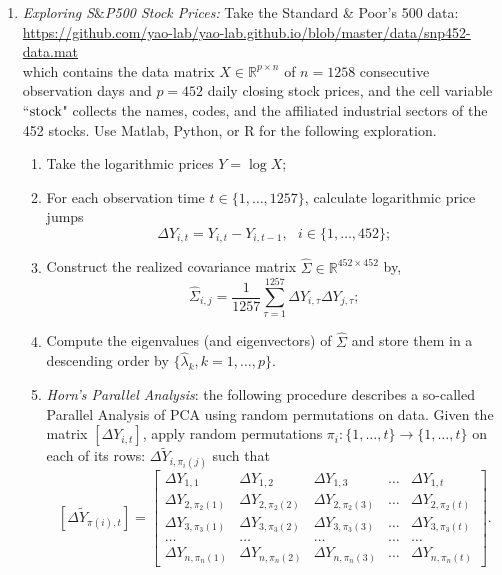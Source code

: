 \documentclass[11pt]{article}
\def\R{{\mathbb R}}
\begin{document}
\begin{enumerate}
\item {\em Exploring S$\&$P500 Stock Prices:} Take the Standard \& Poor's 500 data: \\
\url{https://github.com/yao-lab/yao-lab.github.io/blob/master/data/snp452-data.mat} \\ 
which contains the data matrix $X\in \R^{p\times n}$ of $n=1258$ consecutive observation days and $p=452$ daily closing stock prices, and the cell variable ``${\rm stock}$" collects the names, codes, and the affiliated industrial sectors of the 452 stocks. Use Matlab, Python, or R for the following exploration. 
\begin{enumerate}
\item Take the logarithmic prices $Y=\log X$; 
\item For each observation time $t\in \{1,\ldots,1257\}$, calculate logarithmic price jumps
\[ \Delta Y_{i,t} = Y_{i,t} - Y_{i,{t-1}}, \ \ \ i\in \{ 1,\ldots, 452 \}; \]
\item Construct the realized covariance matrix $\hat{\Sigma}\in\R^{452\times 452}$ by,
\[ \hat{\Sigma}_{i,j} = \frac{1}{1257} \sum_{\tau =1}^{1257} \Delta Y_{i,\tau} \Delta Y_{j, \tau}; \]
\item Compute the eigenvalues (and eigenvectors) of $\hat{\Sigma}$ and store them in a descending order by $\{\hat{\lambda}_k, k=1,\ldots,p\}$. 
\item \emph{Horn's Parallel Analysis}: the following procedure describes a so-called Parallel Analysis of PCA using random permutations on data. Given the matrix $[\Delta Y_{i,t}]$, apply random permutations $\pi_i: \{1,\ldots,t\} \to \{1,\ldots, t\}$ on each of its rows: $\Delta \tilde{Y}_{i,\pi_i(j)}$ such that 
\[
[\Delta \tilde{Y}_{\pi(i),t}] = \left[
\begin{array}{ccccc}
\Delta Y_{1,1} & \Delta Y_{1,2} & \Delta Y_{1,3} & \ldots & \Delta Y_{1,t} \\
\Delta Y_{2,\pi_2(1)} & \Delta Y_{2,\pi_2(2)} & \Delta Y_{2,\pi_2(3)} & \ldots & \Delta Y_{2,\pi_2(t)} \\
\Delta Y_{3,\pi_3(1)} & \Delta Y_{3,\pi_3(2)} & \Delta Y_{3,\pi_3(3)} & \ldots & \Delta Y_{3,\pi_3(t)} \\
\ldots & \ldots & \ldots & \ldots & \ldots \\
\Delta Y_{n,\pi_n(1)} & \Delta Y_{n,\pi_n(2)} & \Delta Y_{n,\pi_n(3)} & \ldots & \Delta Y_{n,\pi_n(t)} 
\end{array}
\right].
\]
\end{enumerate}
\end{enumerate}
\end{document}
